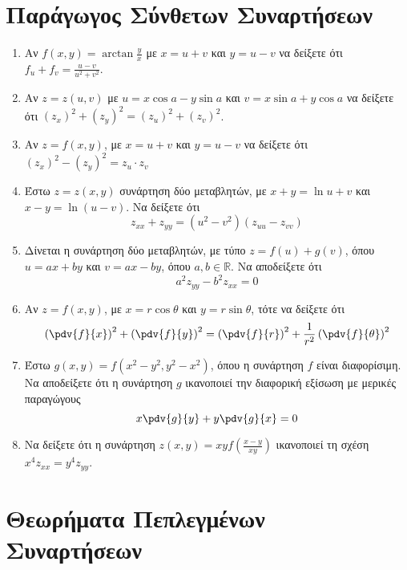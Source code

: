 \section*{Παράγωγος Σύνθετων Συναρτήσεων} 

\begin{enumerate}
  \item Αν $ f(x,y) = \arctan{\frac{y}{x}} $ με $ x=u+v $ και $ y = u-v $ 
    να δείξετε ότι $ f_{u} + f_{v} = \frac{u-v}{u^{2}+v^{2}} $.

  \item  Αν $ z=z(u,v) $ με $ u=x \cos{a} - y \sin{a} $ και $ v= x \sin{a} + y \cos{a} $
    να δείξετε ότι $ (z_{x})^{2} + (z_{y})^{2} = (z_{u})^{2} + (z_{v})^{2} $.

  \item Αν $ z=f(x,y) $, με $ x=u+v $ και $ y = u-v $ να δείξετε ότι 
    $ (z_{x})^{2} - (z_{y})^{2} = z_{u}\cdot z_{v} $ 

  \item Έστω $ z=z(x,y) $ συνάρτηση δύο μεταβλητών, με $ x+y= \ln{u+v} $ και 
    $ x-y = \ln{(u-v)} $. Να δείξετε ότι 
    \[
      z_{xx}+z_{yy} = (u^{2}-v^{2})(z_{uu}-z_{vv}) 
    \]
  \item Δίνεται η συνάρτηση δύο μεταβλητών, με τύπο
    $ z = f(u) + g(v) $, όπου $ u = ax + by $ και $ v = ax - by $, όπου 
    $ a,b \in \mathbb{R} $. Να αποδείξετε ότι 
    \[
      a^{2} z_{yy} - b^{2}z_{xx} = 0 
    \] 
  \item Αν $ z = f(x,y) $, με $ x=r \cos{\theta} $ και $ y = r \sin{\theta} $, 
    τότε να δείξετε ότι
    \[
      \left(\pdv{f}{x}\right)^{2} + \left(\pdv{f}{y}\right)^{2} = 
      \left(\pdv{f}{r}\right)^{2} + \frac{1}{ r^{2}} 
      \left(\pdv{f}{\theta}\right)^{2} 
    \] 
  \item Έστω $ g(x,y) = f(x^{2} - y^{2}, y^{2} - x^{2}) $, όπου η συνάρτηση 
    $f$ είναι διαφορίσιμη. Να αποδείξετε ότι η συνάρτηση $g$ ικανοποιεί 
    την διαφορική εξίσωση με μερικές παραγώγους
    \[
      x\pdv{g}{y} + y\pdv{g}{x} = 0
    \] 
  \item Να δείξετε ότι η συνάρτηση $ z(x,y) = xyf\left(\frac{ x-y }{ xy }\right) $
    ικανοποιεί τη σχέση $ x^{4} z_{xx} = y^{4} z_{yy} $.


\end{enumerate}

\section*{Θεωρήματα Πεπλεγμένων Συναρτήσεων}

